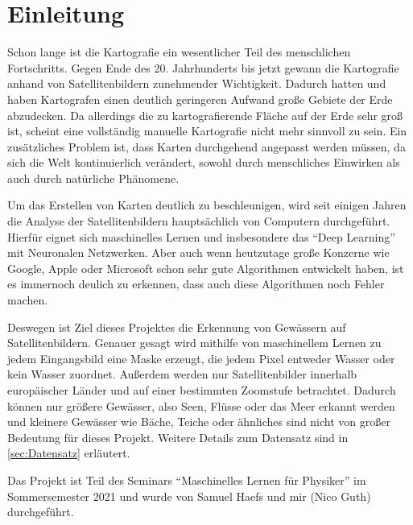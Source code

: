 \section{Einleitung}
\label{sec:Einleitung}

Schon lange ist die Kartografie ein wesentlicher Teil des menschlichen Fortschritts.
Gegen Ende des 20. Jahrhunderts bis jetzt gewann die Kartografie anhand von Satellitenbildern zunehmender Wichtigkeit.
Dadurch hatten und haben Kartografen einen deutlich geringeren Aufwand große Gebiete der Erde abzudecken.
Da allerdings die zu kartografierende Fläche auf der Erde sehr groß ist, scheint eine vollständig manuelle Kartografie nicht mehr sinnvoll zu sein.
Ein zusätzliches Problem ist, dass Karten durchgehend angepasst werden müssen, da sich die Welt kontinuierlich verändert, 
sowohl durch menschliches Einwirken als auch durch natürliche Phänomene.

Um das Erstellen von Karten deutlich zu beschleunigen, wird seit einigen Jahren die Analyse der Satellitenbildern hauptsächlich von Computern durchgeführt.
Hierfür eignet sich maschinelles Lernen und insbesondere das \enquote{Deep Learning} mit Neuronalen Netzwerken.
Aber auch wenn heutzutage große Konzerne wie Google, Apple oder Microsoft schon sehr gute Algorithmen entwickelt haben,
ist es immernoch deulich zu erkennen, dass auch diese Algorithmen noch Fehler machen.

Deswegen ist Ziel dieses Projektes die Erkennung von Gewässern auf Satellitenbildern.
Genauer gesagt wird mithilfe von maschinellem Lernen zu jedem Eingangsbild eine Maske erzeugt, die jedem Pixel entweder Wasser oder kein Wasser zuordnet.
Außerdem werden nur Satellitenbilder innerhalb europäischer Länder und auf einer bestimmten Zoomstufe betrachtet.
Dadurch können nur größere Gewässer, also Seen, Flüsse oder das Meer erkannt werden und kleinere Gewässer wie Bäche, Teiche oder ähnliches sind nicht von großer Bedeutung für dieses Projekt.
Weitere Details zum Datensatz sind in \autoref{sec:Datensatz} erläutert.

Das Projekt ist Teil des Seminars \enquote{Maschinelles Lernen für Physiker} im Sommersemester 2021 und wurde von Samuel Haefs und mir (Nico Guth) durchgeführt.
